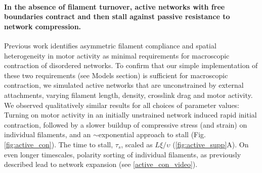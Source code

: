 \paragraph{In the absence of filament turnover, active networks with free boundaries contract and then stall against passive resistance to network compression.}


Previous work \cite{1367-2630-14-3-033037,rheo_2D1,rheo_active} identifies asymmetric filament compliance and spatial heterogeneity in motor activity as minimal requirements for macroscopic contraction of disordered networks. To confirm that our simple implementation of these two requirements (see Models section) is sufficient for macroscopic contraction, we simulated active networks that are unconstrained by external attachments, varying filament length, density, crosslink drag and motor activity.  We observed qualitatively similar results for all choices of parameter values:  Turning on motor activity in an initially unstrained network induced rapid initial contraction, followed by a slower buildup of compressive stress (and strain) on individual filaments, and an $\sim$exponential approach to stall (Fig. \ref{fig:active_con}). The time to stall, $\tau_s$, scaled as $L\xi/\upsilon$ (\ref{fig:active_supp}A). On even longer timescales, polarity sorting of individual filaments, as previously described \cite{Reymann1310,Murrell15062014,Ndlec:1997aa,Surrey1167} lead to network expansion (see \ref{active_con_video}).


